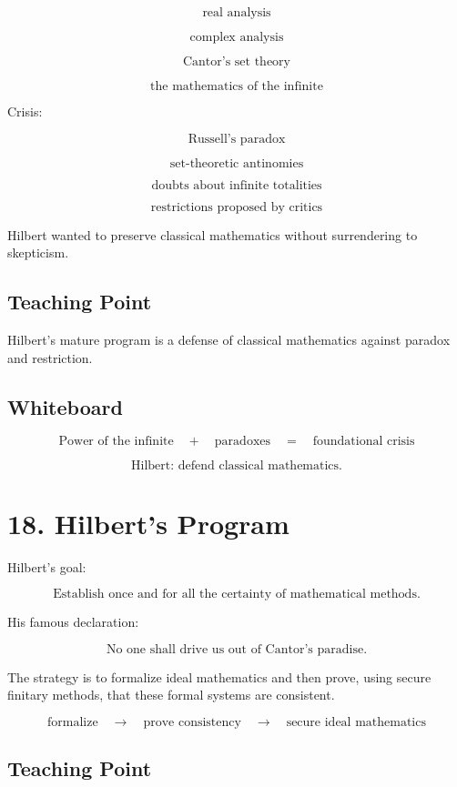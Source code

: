 \documentclass[11pt]{article}
\begin{document}
\[
\text{real analysis}
\]

\[
\text{complex analysis}
\]

\[
\text{Cantor's set theory}
\]

\[
\text{the mathematics of the infinite}
\]

Crisis:

\[
\text{Russell's paradox}
\]

\[
\text{set-theoretic antinomies}
\]

\[
\text{doubts about infinite totalities}
\]

\[
\text{restrictions proposed by critics}
\]

Hilbert wanted to preserve classical mathematics without surrendering to skepticism.

\subsection*{Teaching Point}

Hilbert's mature program is a defense of classical mathematics against paradox and
restriction.

\subsection*{Whiteboard}

\[
\text{Power of the infinite}
\quad +
\quad
\text{paradoxes}
\quad =
\quad
\text{foundational crisis}
\]

\[
\text{Hilbert: defend classical mathematics.}
\]

\section*{18. Hilbert's Program}

Hilbert's goal:

\[
\boxed{
\text{Establish once and for all the certainty of mathematical methods.}
}
\]

His famous declaration:

\[
\boxed{
\text{No one shall drive us out of Cantor's paradise.}
}
\]

The strategy is to formalize ideal mathematics and then prove, using secure finitary
methods, that these formal systems are consistent.

\[
\text{formalize}
\quad \longrightarrow \quad
\text{prove consistency}
\quad \longrightarrow \quad
\text{secure ideal mathematics}
\]

\subsection*{Teaching Point}
\end{document}
